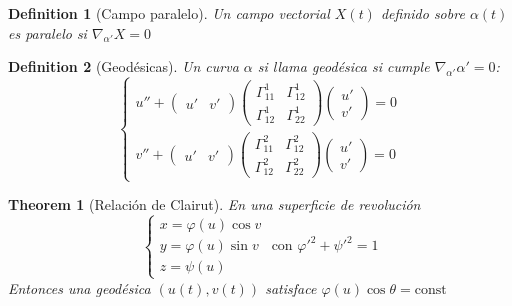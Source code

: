 \documentclass{myclass}
\newtheorem*{definition}{Definition}
\newtheorem*{theorem}{Theorem}
\begin{document}
\begin{definition}[Campo paralelo]
Un campo vectorial $X(t)$ definido sobre $\alpha (t)$ es paralelo si $\nabla _{\alpha'}X=0$ 
\end{definition}

\begin{definition}[Geodésicas]
Un curva $\alpha $ si llama geodésica si cumple $\nabla _{\alpha '}\alpha ' = 0$:
\[
  \begin{cases}
   u'' + \begin{pmatrix} u' & v' \end{pmatrix} \begin{pmatrix} \Gamma_{11}^1 & \Gamma _{12}^1 \\ \Gamma _{12}^1 & \Gamma_{22}^1 \end{pmatrix} \begin{pmatrix} u' \\ v' \end{pmatrix} =0  \\
  v'' + \begin{pmatrix} u' & v' \end{pmatrix} \begin{pmatrix} \Gamma _{11}^2 & \Gamma _{12}^2 \\ \Gamma _{12}^2 & \Gamma _{22}^2 \end{pmatrix} \begin{pmatrix} u' \\ v' \end{pmatrix} = 0
  \end{cases}
\] 
\end{definition}

\begin{theorem}[Relación de Clairut]
En una superficie de revolución
\[
\begin{cases}
  x = \varphi (u)\cos v\\
  y = \varphi (u)\sin v \\
  z = \psi (u)
\end{cases}
\text{ con } \varphi '^2 + \psi '^2 = 1
\] 
Entonces una geodésica $(u(t), v(t))$ satisface $\varphi (u)\cos \theta = \text{const}$
\end{theorem}
\end{document}
